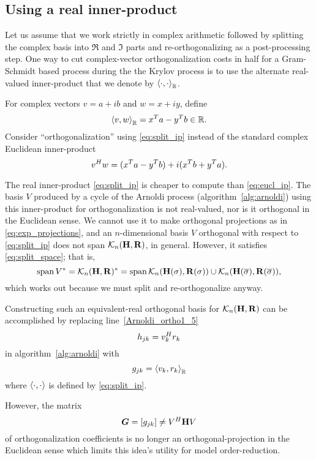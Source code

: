 \subsection{Using a real inner-product}\label{sec:eqreal}
Let us assume that we work strictly in complex arithmetic followed by splitting the complex basis into $\Re$ and $\Im$ parts and re-orthogonalizing as a post-processing step.    One way to cut complex-vector orthogonalization costs in half for a Gram-Schmidt based process during the the Krylov process is to use the alternate  real-valued  inner-product that we denote by $\left< \cdot,\cdot \right>_{\mathbb{R}}$.  

For complex vectors $v=a+i b$ and  $w=x+i y$,  define
\begin{equation}
  	\left< v,w \right>_{\mathbb{R}} = x^T a - y^T b \in \mathbb{R}.
\label{eq:split_ip}
\end{equation}
Consider ``orthogonalization'' using \eqref{eq:split_ip} instead of the standard complex Euclidean inner-product 
\begin{equation}
	v^H w = (x^T a - y^T b) + i(x^T b + y^T a).
\label{eq:eucl_ip}
\end{equation}

The real inner-product  \eqref{eq:split_ip} is cheaper to compute than \eqref{eq:eucl_ip}.   The basis $V$ produced by a cycle of the Arnoldi process (algorithm~\ref{alg:arnoldi}) using this inner-product for orthogonalization is not real-valued, nor is it orthogonal in the Euclidean sense.  We cannot use it to make orthogonal projections as in \eqref{eq:exp_projections}, and an $n$-dimensional basis $V$ orthogonal with respect to \eqref{eq:split_ip} does not span $\mathcal{K}_{n}({\textbf{\textup{H}}},{\textbf{\textup{R}}})$, in general.  However, it satisfies \eqref{eq:split_space}; that is, 
\[
\operatorname*{span} V^* = \mathcal{K}_{n}({\textbf{\textup{H}}},{\textbf{\textup{R}}})^* =  \operatorname*{span} \mathcal{K}_{n}({\textbf{\textup{H}}(\sigma)},{\textbf{\textup{R}}(\sigma)}) \cup  \mathcal{K}_{n}({\textbf{\textup{H}}(\overline{\sigma})},{\textbf{\textup{R}}(\overline{\sigma})}),
\]
which works out because we must split and re-orthogonalize anyway. 

Constructing such an equivalent-real orthogonal basis for  $\mathcal{K}_{n}({\textbf{\textup{H}}},{\textbf{\textup{R}}})$ can be accomplished  
by replacing line~\ref{Arnoldi_ortho1_5}
\[
h_{jk} = v_k^Hr_k
\]
 in algorithm~\ref{alg:arnoldi} with 
\[
g_{jk} = \left< v_k,r_k \right>_{\mathbb{R}}
\]
where $\left< \cdot,\cdot \right>$ is defined by \eqref{eq:split_ip}.

However, the matrix 
\begin{equation}
\boldsymbol{G}= [g_{jk}] \neq V^H \textbf{\textup{H}} V
\label{eq:Gmat} 
\end{equation}
of orthogonalization coefficients is no longer an orthogonal-projection in the Euclidean sense which limits this idea's utility for model order-reduction. 



